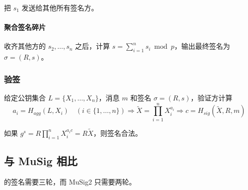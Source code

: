 \documentclass[a4paper,10pt]{article}
\begin{document}
把 \(s_1\) 发送给其他所有签名方。

\paragraph{聚合签名碎片} 收齐其他方的 \(s_2,\dots,s_n\) 之后，计算 \(s=\sum_{i=1}^n s_i\bmod p\)，输出最终签名为 \(\sigma=(R,s)\)。

\subsubsection{验签}
给定公钥集合 \(L=\{X_1,\dots,X_n\}\)，消息 \(m\) 和签名 \(\sigma=(R,s)\)，验证方计算
\[
  a_i=H_{agg}(L,X_i) \quad (i\in\{1,\dots,n\}) \Rightarrow \tilde{X}=\prod_{i=1}^n X_i^{a_i} \Rightarrow c=H_{sig}(\tilde{X},R,m)
\]
 
如果 \(g^s=R\prod_{i=1}^n X_i^{a_i c}=R\tilde{X}\)，则签名合法。

\subsection{与 MuSig 相比}
\cite{cryptoeprint:2018:068} 的签名需要三轮，而 MuSig2 只需要两轮。



\end{document}
